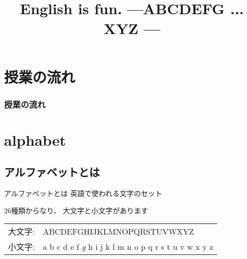 \documentclass[aspectratio=169,xcolor={dvipsnames,table}]{beamer}
\title{English is fun.\,\,{}---ABCDEFG ... XYZ ---}
\author{}
\institute[]{}
\date[]
\begin{document}
%
%
%
%
%
%
%
%
%
%
%

\begin{frame}[label=title]
\label{section-1}
\thispagestyle{empty}
\titlepage
\end{frame}


\section*{授業の流れ}
\begin{frame}[plain]
  \frametitle{授業の流れ}
  \tableofcontents
\end{frame}

\section{alphabet}
\subsection{アルファベットとは}

\begin{frame}[plain,label=what_is_alphabet]{アルファベットとは}
\Large
\pause
英語で使われる文字のセット\pause

\bigskip

26種類からなり、\pause
大文字と小文字があります\pause

\begin{rmfamily}
\begin{tabular}{lp{}}
大文字:& ABCDEFGHIJKLMNOPQRSTUVWXYZ\\\pause
小文字:& a b c d e f {\itshape g} h i j k l m n o p q r s t u v w x y z
\end{tabular}

\end{rmfamily}

\end{frame}
\end{document}
